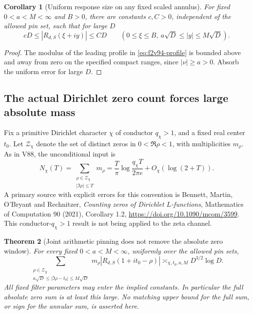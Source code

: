 \documentclass[11pt]{article}
\newtheorem{theorem}{Theorem}[section]
\newtheorem{corollary}[theorem]{Corollary}
\theoremstyle{definition}
\theoremstyle{remark}
\begin{document}
\begin{corollary}[Uniform response size on any fixed scaled annulus]
\label{cor:f2v94-annulus}
For fixed \(0<a<M<\infty\) and \(B>0\), there are constants
\(c,C>0\), independent of the allowed pin set, such that for large
\(D\)
\begin{equation}
 cD\le |R_{d,S}(\xi+iy)|\le CD
 \qquad(0\le\xi\le B,\ a\sqrt D\le|y|\le M\sqrt D).
 \label{eq:f2v94-annulus}
\end{equation}
\end{corollary}
\begin{proof}
The modulus of the leading profile in
\eqref{eq:f2v94-profile} is bounded above and away from zero on the
specified compact ranges, since \(|\nu|\ge a>0\).  Absorb the
uniform error for large \(D\).
\end{proof}

\subsection{The actual Dirichlet zero count forces large absolute mass}

Fix a primitive Dirichlet character \(\chi\) of conductor \(q_\chi>1\),
and a fixed real center \(t_0\).  Let \(\mathcal Z_\chi\) denote
the set of distinct zeros in \(0<\Re\rho<1\), with multiplicities
\(m_\rho\).  As in V88, the unconditional input is
\begin{equation}
 N_\chi(T)=\sum_{\substack{\rho\in\mathcal Z_\chi\\|\Im\rho|\le T}}
                  m_\rho
 =\frac{T}{\pi}\log\frac{q_\chi T}{2\pi e}
                     +O_\chi(\log(2+T)).
 \label{eq:f2v94-zero-count}
\end{equation}
A primary source with explicit errors for this convention is Bennett,
Martin, O'Bryant and Rechnitzer, \emph{Counting zeros of Dirichlet
\(L\)-functions}, Mathematics of Computation 90 (2021), Corollary 1.2,
\url{https://doi.org/10.1090/mcom/3599}.  This conductor-\(q_\chi>1\)
result is not being applied to the zeta channel.

\begin{theorem}[Joint arithmetic pinning does not remove the absolute zero window]
\label{thm:f2v94-zero-mass}
For every fixed \(0<a<M<\infty\), uniformly over the allowed pin sets,
\begin{equation}
 \sum_{\substack{\rho\in\mathcal Z_\chi\\
       a\sqrt D\le|\Im\rho-t_0|\le M\sqrt D}}
       m_\rho|R_{d,S}(1+it_0-\rho)|
 \asymp_{\chi,t_0,a,M}D^{3/2}\log D.
 \label{eq:f2v94-zero-mass}
\end{equation}
All fixed filter parameters may enter the implied constants.  In
particular the full absolute zero sum is at least this large.  No
matching upper bound for the full sum, or sign for the annular sum,
is asserted here.
\end{theorem}
\end{document}
